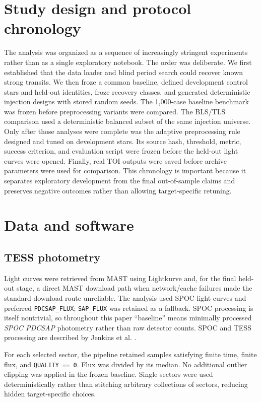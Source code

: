 \documentclass[11pt]{article}
\begin{document}
\section{Study design and protocol chronology}
The analysis was organized as a sequence of increasingly stringent experiments rather than as a single exploratory notebook. The order was deliberate. We first established that the data loader and blind period search could recover known strong transits. We then froze a common baseline, defined development control stars and held-out identities, froze recovery classes, and generated deterministic injection designs with stored random seeds. The 1,000-case baseline benchmark was frozen before preprocessing variants were compared. The BLS/TLS comparison used a deterministic balanced subset of the same injection universe. Only after those analyses were complete was the adaptive preprocessing rule designed and tuned on development stars. Its source hash, threshold, metric, success criterion, and evaluation script were frozen before the held-out light curves were opened. Finally, real TOI outputs were saved before archive parameters were used for comparison. This chronology is important because it separates exploratory development from the final out-of-sample claims and preserves negative outcomes rather than allowing target-specific retuning.

\section{Data and software}
\subsection{TESS photometry}
Light curves were retrieved from MAST using Lightkurve \cite{Lightkurve2018} and, for the final held-out stage, a direct MAST download path when network/cache failures made the standard download route unreliable. The analysis used SPOC light curves and preferred \texttt{PDCSAP\_FLUX}; \texttt{SAP\_FLUX} was retained as a fallback. SPOC processing is itself nontrivial, so throughout this paper ``baseline'' means minimally processed \emph{SPOC PDCSAP} photometry rather than raw detector counts. SPOC and TESS processing are described by Jenkins et al. \cite{Jenkins2016}.

For each selected sector, the pipeline retained samples satisfying finite time, finite flux, and \texttt{QUALITY == 0}. Flux was divided by its median. No additional outlier clipping was applied in the frozen baseline. Single sectors were used deterministically rather than stitching arbitrary collections of sectors, reducing hidden target-specific choices.
\end{document}
